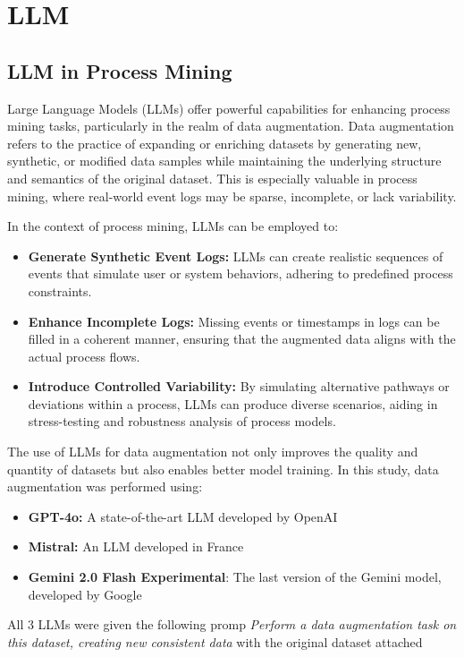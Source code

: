 \section{LLM}
\subsection{LLM in Process Mining}
Large Language Models (LLMs) offer powerful capabilities for enhancing process mining tasks, particularly in the realm of data augmentation. Data augmentation refers to the practice of expanding or enriching datasets by generating new, synthetic, or modified data samples while maintaining the underlying structure and semantics of the original dataset. This is especially valuable in process mining, where real-world event logs may be sparse, incomplete, or lack variability.

In the context of process mining, LLMs can be employed to:
\begin{itemize}
    \item \textbf{Generate Synthetic Event Logs:} LLMs can create realistic sequences of events that simulate user or system behaviors, adhering to predefined process constraints.
    \item \textbf{Enhance Incomplete Logs:} Missing events or timestamps in logs can be filled in a coherent manner, ensuring that the augmented data aligns with the actual process flows.
    \item \textbf{Introduce Controlled Variability:} By simulating alternative pathways or deviations within a process, LLMs can produce diverse scenarios, aiding in stress-testing and robustness analysis of process models.
\end{itemize}

The use of LLMs for data augmentation not only improves the quality and quantity of datasets but also enables better model training.
In this study, data augmentation was performed using:
\begin{itemize}
    \item \textbf{GPT-4o:} A state-of-the-art LLM developed by OpenAI
    \item \textbf{Mistral:} An LLM developed in France
    \item \textbf{Gemini 2.0 Flash Experimental}: The last version of the Gemini model, developed by Google
\end{itemize}
All 3 LLMs were given the following promp
\textit{Perform a data augmentation task on this dataset, creating new consistent data} with the original dataset attached
